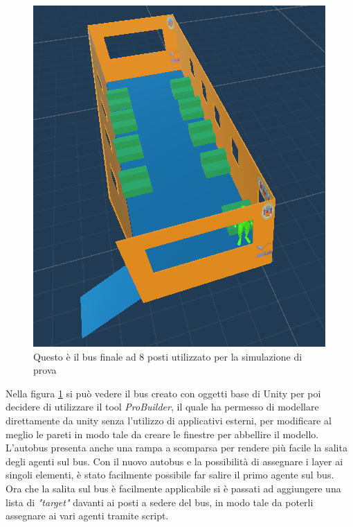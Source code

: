 \documentclass[12pt, openany]{book}
\begin{document}
	\begin{figure}[H]
		\centering
		\includegraphics[width=1\linewidth]{"Immagini/BasicBus.png"}
		\caption{Questo è il bus finale ad 8 posti utilizzato per la simulazione di prova}
		\label{fig:BasicBus}
	\end{figure}
	Nella figura \ref{fig:BasicBus} si può vedere il bus creato con oggetti base di Unity per poi decidere di utilizzare il tool \emph{ProBuilder}, il quale ha permesso di modellare direttamente da unity senza l'utilizzo di applicativi esterni, per modificare al meglio le pareti in modo tale da creare le finestre per abbellire il modello. L'autobus presenta anche una rampa a scomparsa per rendere più facile la salita degli agenti sul bus.
	Con il nuovo autobus e la possibilità di assegnare i layer ai singoli elementi, è stato facilmente possibile far salire il primo agente sul bus.\\
	Ora che la salita sul bus è facilmente applicabile si è passati ad aggiungere una lista di \emph{"target"} davanti ai posti a sedere del bus, in modo tale da poterli assegnare ai vari agenti tramite script.
\end{document}
